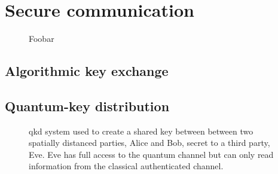 \section{Secure communication}

\begin{figure}[htb]
	\centering
	
	\caption{Foobar}
\end{figure}


\subsection{Algorithmic key exchange}



\subsection{Quantum-key distribution}



\begin{figure}[htb]
	\centering
	
	\caption{\Gls{qkd} system used to create a shared key between between two spatially distanced parties, Alice and Bob, secret to a third party, Eve. Eve has full access to the quantum channel but can only read information from the classical authenticated channel.}
\end{figure}



